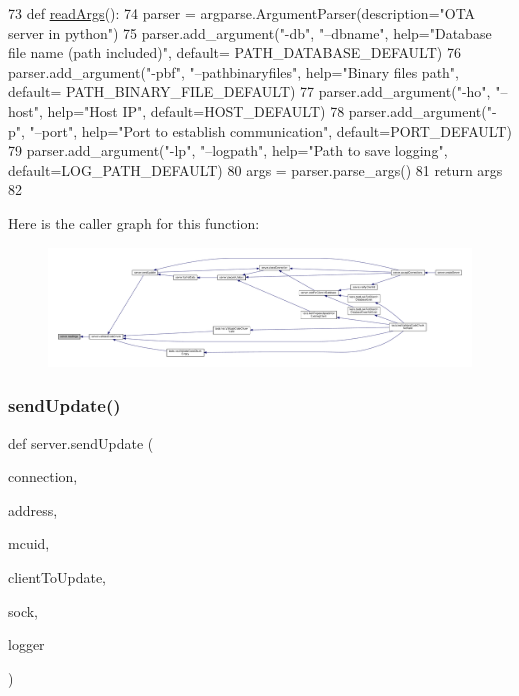 \begin{DoxyCode}
73 \textcolor{keyword}{def }\hyperlink{namespaceserver_aa317dc86338d02253076787cc8e5d997}{readArgs}():
74      parser = argparse.ArgumentParser(description=\textcolor{stringliteral}{"OTA server in python"})
75      parser.add\_argument(\textcolor{stringliteral}{"-db"}, \textcolor{stringliteral}{"--dbname"}, help=\textcolor{stringliteral}{"Database file name (path included)"}, default=
      PATH\_DATABASE\_DEFAULT)
76      parser.add\_argument(\textcolor{stringliteral}{"-pbf"}, \textcolor{stringliteral}{"--pathbinaryfiles"}, help=\textcolor{stringliteral}{"Binary files path"}, default=
      PATH\_BINARY\_FILE\_DEFAULT)
77      parser.add\_argument(\textcolor{stringliteral}{"-ho"}, \textcolor{stringliteral}{"--host"}, help=\textcolor{stringliteral}{"Host IP"}, default=HOST\_DEFAULT)
78      parser.add\_argument(\textcolor{stringliteral}{"-p"}, \textcolor{stringliteral}{"--port"}, help=\textcolor{stringliteral}{"Port to establish communication"}, default=PORT\_DEFAULT)
79      parser.add\_argument(\textcolor{stringliteral}{"-lp"}, \textcolor{stringliteral}{"--logpath"}, help=\textcolor{stringliteral}{"Path to save logging"}, default=LOG\_PATH\_DEFAULT)
80      args = parser.parse\_args()
81      \textcolor{keywordflow}{return} args
82 
\end{DoxyCode}
Here is the caller graph for this function\+:
\nopagebreak
\begin{figure}[H]
\begin{center}
\leavevmode
\includegraphics[width=350pt]{namespaceserver_aa317dc86338d02253076787cc8e5d997_icgraph}
\end{center}
\end{figure}
\mbox{\label{namespaceserver_a4889d0db3f3503cc61340252fabc2c24}} 
\subsubsection{\texorpdfstring{send\+Update()}{sendUpdate()}}
{\footnotesize\ttfamily def server.\+send\+Update (\begin{DoxyParamCaption}\item[{}]{connection,  }\item[{}]{address,  }\item[{}]{mcuid,  }\item[{}]{client\+To\+Update,  }\item[{}]{sock,  }\item[{}]{logger }\end{DoxyParamCaption})}


